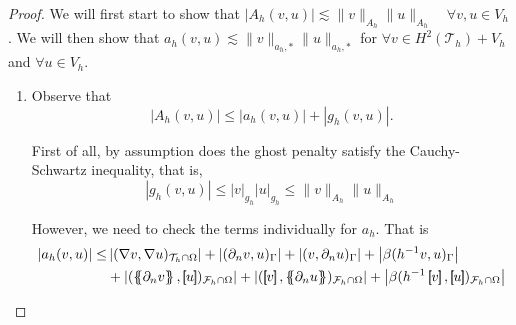 \begin{proof}
We will first start to show that $\left\lvert A_{h}( v,u) \right\rvert \lesssim \| v \|_{A_{h}  }^{  }     \| u \|_{A_{h}  }^{  } \quad  \forall v,u \in V_{h} $. We will then show that
$a_{h}( v,u) \lesssim \| v \|_{ a_{h},* }^{  }  \| u \|_{ a_{h},* }^{  }$
for $ \forall v \in  H^{2}( \mathcal{T}_{h} ) + V_{h} $ and $ \forall u \in V_{h}$.

    \begin{enumerate}[label=\arabic*)]
        \item  Observe that \[
    \left\lvert A_{h}( v,u) \right\rvert \le  \left\lvert a_{h}( v,u)  \right\rvert  + \left\lvert g_{h}( v,u)  \right\rvert.
    \]

         First of all, by assumption does the ghost penalty satisfy the Cauchy-Schwartz inequality, that is,  \[
\left\lvert g_{h}( v,u)  \right\rvert \le \left\lvert v \right\rvert _{g_{h}} \left\lvert u \right\rvert _{g_{h}} \le \| v \|_{ A_{h} }^{  } \| u \|_{ A_{h} }^{  }
    \]

    However, we need to check the terms individually for $a_{h}$. That is      \[
        \begin{split}
    \left\lvert a_{h}( v,u)  \right\rvert \le & \left\lvert( \nabla v, \nabla u)_{\mathcal{T} _{h} \cap \Omega }  \right\rvert +  \left\lvert  ( \partial _{n} v,u)_{\Gamma } \right\rvert   + \left\lvert ( v, \partial _{n} u)_{\Gamma } \right\rvert  +
    \left\lvert\beta ( h^{-1} v,u)_{\Gamma }  \right\rvert  \\
    & + \left\lvert( \mean{ \partial _{n} v }  , \jump{ u }  ) _{\mathcal{F} _{h} \cap \Omega }  \right\rvert  + \left\lvert ( \jump{ v }  , \mean{ \partial _{n} u }  )_{\mathcal{F} _{h}\cap \Omega } \right\rvert  + \left\lvert \beta ( h^{-1} \jump{ v }  ,
    \jump{ u }  )_{\mathcal{F}_{h}\cap \Omega  } \right\rvert \\
        \end{split}
    \]


\end{enumerate}
\end{proof}
